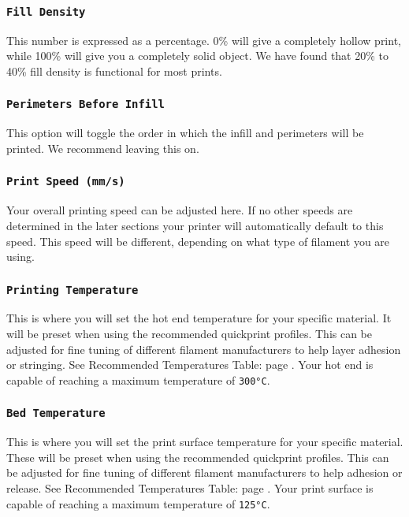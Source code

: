 \subsubsection{\texttt{Fill Density}}
This number is expressed as a percentage. 0\% will give a completely hollow print, while 100\% will give you a completely solid object. We have found that 20\% to 40\% fill density is functional for most prints.

\subsubsection{\texttt{Perimeters Before Infill}}
This option will toggle the order in which the infill and perimeters will be printed. We recommend leaving this on.
\subsubsection{\texttt{Print Speed (mm/s)}}
Your overall printing speed can be adjusted here. If no other speeds are determined in the later sections your printer will automatically default to this speed. This speed will be different, depending on what type of filament you are using.

\subsubsection{\texttt{Printing Temperature}}
This is where you will set the hot end temperature for your specific material. It will be preset when using the recommended quickprint profiles. This can be adjusted for fine tuning of different filament manufacturers to help layer adhesion or stringing. See Recommended Temperatures Table: page \pageref{tab:a}. Your hot end is capable of reaching a maximum temperature of \texttt{300°C}.


\subsubsection{\texttt{Bed Temperature}}
This is where you will set the print surface temperature for your specific material. These will be preset when using the recommended quickprint profiles. This can be adjusted for fine tuning of different filament manufacturers to help adhesion or release. See Recommended Temperatures Table: page \pageref{tab:a}. Your print surface is capable of reaching a maximum temperature of \texttt{125°C}. 

